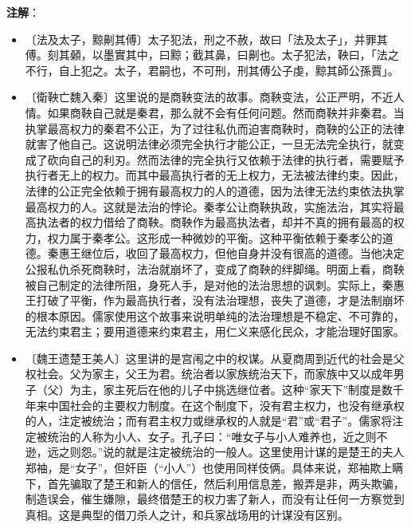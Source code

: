 \documentclass[12pt,UTF-8,openany,a4]{ctexbook}
\begin{document}
\newpage

\begin{Large}
   \noindent \textbf{注解}：
\end{Large}

\vspace{-1em}

\begin{itemize}
    \setlength\itemsep{-0.2em}
    \item〔法及太子，黥劓其傅〕{\yiwen 太子犯法，刑之不赦，故曰「法及太子」，并罪其傅。刻其顙，以墨實其中，曰黥；截其鼻，曰劓也。太子犯法，鞅曰，「法之不行，自上犯之。太子，君嗣也，不可刑，刑其傅公子虔，黥其師公孫賈」。}
    \item〔衛鞅亡魏入秦〕{\yiwen 这里说的是商鞅变法的故事。商鞅变法，公正严明，不近人情。如果商鞅自己就是秦君，那么就不会有任何问题。然而商鞅并非秦君。当执掌最高权力的秦君不公正，为了过往私仇而迫害商鞅时，商鞅的公正的法律就害了他自己。这说明法律必须完全执行才能公正，一旦无法完全执行，就变成了砍向自己的利刃。然而法律的完全执行又依赖于法律的执行者，需要赋予执行者无上的权力。而其中最高执行者的无上权力，无法被法律约束。因此，法律的公正完全依赖于拥有最高权力的人的道德，因为法律无法约束依法执掌最高权力的人。这就是法治的悖论。秦孝公让商鞅执政，实施法治，其实将最高执法者的权力借给了商鞅。商鞅作为最高执法者，却并不真的拥有最高的权力，权力属于秦孝公。这形成一种微妙的平衡。这种平衡依赖于秦孝公的道德。秦惠王继位后，收回了最高权力，但他自身并没有很高的道德。当他决定公报私仇杀死商鞅时，法治就崩坏了，变成了商鞅的绊脚绳。明面上看，商鞅被自己制定的法律所阻，身死人手，是对他的法治思想的讽刺。实际上，秦惠王打破了平衡，作为最高执行者，没有法治理想，丧失了道德，才是法制崩坏的根本原因。儒家使用这个故事来说明单纯的法治理想是不稳定、不可靠的，无法约束君主；要用道德来约束君主，用仁义来感化民众，才能治理好国家。}
    \item〔魏王遗楚王美人〕{\yiwen 这里讲的是宫闱之中的权谋。从夏商周到近代的社会是父权社会。父为家主，父王为君。统治者以家族统治天下，而家族中又以成年男子（父）为主，家主死后在他的儿子中挑选继位者。这种“家天下”制度是数千年来中国社会的主要权力制度。在这个制度下，没有君主权力，也没有继承权的人，注定被统治；而有君主权力或继承权的人就是“君”或“君子”。儒家将注定被统治的人称为小人、女子。孔子曰：“唯女子与小人难养也，近之则不逊，远之则怨。”说的就是注定被统治的一般人。这里使用计谋的是楚王的夫人郑袖，是“女子”，但奸臣（“小人”）也使用同样伎俩。具体来说，郑袖欺上瞒下，首先骗取了楚王和新人的信任，然后利用信息差，搬弄是非，两头欺骗，制造误会，催生嫌隙，最终借楚王的权力害了新人，而没有让任何一方察觉到真相。这是典型的借刀杀人之计，和兵家战场用的计谋没有区别。}

\end{itemize}
\end{document}
